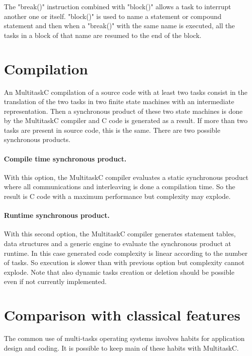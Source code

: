 \documentclass[10pt]{report}
\begin{document}
The "break()" instruction combined with "block()" allows a task to interrupt another one or itself. "block()"
is used to name a statement or compound statement and then when a "break()" with the same name is executed,
all the tasks in a block of that name are resumed to the end of the block.

\section{Compilation}

An MultitaskC compilation of a source code with at least two tasks consist in the translation of the two
tasks in two finite state machines with an intermediate representation. Then a synchronous product
of these two state machines is done by the MultitaskC compiler and C code is generated as a result.
If more than two tasks are present in source code, this is the same. There are two possible
synchronous products.

\paragraph{Compile time synchronous product.} With this option, the MultitaskC compiler evaluates a static
synchronous product where all communications and interleaving is done a compilation time. So the result is
C code with a maximum performance but complexity may explode.

\paragraph{Runtime synchronous product.} With this second option, the MultitaskC compiler generates statement
tables, data structures and a generic engine to evaluate the synchronous product at runtime. In this case
generated code complexity is linear according to the number of tasks. So execution is slower than with
previous option but complexity cannot explode. Note that also dynamic tasks creation or deletion should
be possible even if not currently implemented.

\section{Comparison with classical features}

The common use of multi-tasks operating systems involves habits for application design and coding. It is
possible to keep main of these habits with MultitaskC.
\end{document}
